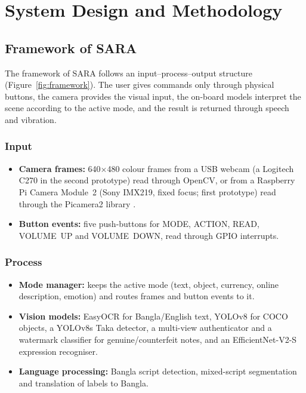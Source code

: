 \clearpage
\chapter{System Design and Methodology}
\label{chap:design}

\section{Framework of SARA}
\label{sec:framework}

The framework of SARA follows an input--process--output structure (Figure~\ref{fig:framework}). The user gives commands only through physical buttons, the camera provides the visual input, the on-board models interpret the scene according to the active mode, and the result is returned through speech and vibration.

\subsection*{Input}
\begin{itemize}[noitemsep]
    \item \textbf{Camera frames:} 640$\times$480 colour frames from a USB webcam (a Logitech C270 in the second prototype) read through OpenCV, or from a Raspberry Pi Camera Module~2 (Sony IMX219, fixed focus; first prototype) read through the Picamera2 library \cite{picamera2}.
    \item \textbf{Button events:} five push-buttons for MODE, ACTION, READ, VOLUME~UP and VOLUME~DOWN, read through GPIO interrupts.
\end{itemize}

\subsection*{Process}
\begin{itemize}[noitemsep]
    \item \textbf{Mode manager:} keeps the active mode (text, object, currency, online description, emotion) and routes frames and button events to it.
    \item \textbf{Vision models:} EasyOCR for Bangla/English text, YOLOv8 for COCO objects, a YOLOv8s Taka detector, a multi-view authenticator and a watermark classifier for genuine/counterfeit notes, and an EfficientNet-V2-S expression recogniser.
    \item \textbf{Language processing:} Bangla script detection, mixed-script segmentation and translation of labels to Bangla.
\end{itemize}


